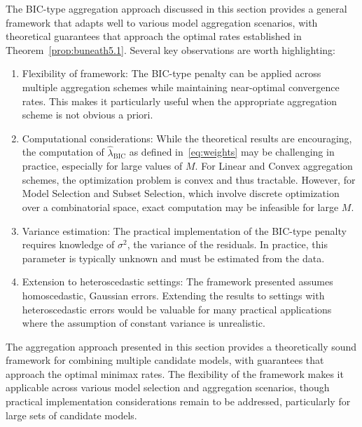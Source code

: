 \documentclass[11pt, letter paper]{article}
\newcommand{\1}{\mathmybb{1}}
\newcommand{\0}{\emptyset}
\newcommand{\lambdahat}[1]{\hat{\lambda}_{#1}}
\begin{document}
The BIC-type aggregation approach discussed in this section provides a general framework that adapts well to various model aggregation scenarios, with theoretical guarantees that approach the optimal rates established in Theorem~\ref{prop:buneath5.1}. Several key observations are worth highlighting:
\begin{enumerate}
    \item Flexibility of framework: The BIC-type penalty can be applied across multiple aggregation schemes while maintaining near-optimal convergence rates. This makes it particularly useful when the appropriate aggregation scheme is not obvious a priori.
    \item Computational considerations: While the theoretical results are encouraging, the computation of $\lambdahat{\text{BIC}}$ as defined in~\eqref{eq:weights} may be challenging in practice, especially for large values of $M$. For Linear and Convex aggregation schemes, the optimization problem is convex and thus tractable. However, for Model Selection and Subset Selection, which involve discrete optimization over a combinatorial space, exact computation may be infeasible for large $M$.
    \item Variance estimation: The practical implementation of the BIC-type penalty requires knowledge of $\sigma^2$, the variance of the residuals. In practice, this parameter is typically unknown and must be estimated from the data.
    \item Extension to heteroscedastic settings: The framework presented assumes homoscedastic, Gaussian errors. Extending the results to settings with heteroscedastic errors would be valuable for many practical applications where the assumption of constant variance is unrealistic.
\end{enumerate}

The aggregation approach presented in this section provides a theoretically sound framework for combining multiple candidate models, with guarantees that approach the optimal minimax rates. The flexibility of the framework makes it applicable across various model selection and aggregation scenarios, though practical implementation considerations remain to be addressed, particularly for large sets of candidate models. 



\newpage
\printbibliography{}
\end{document}
